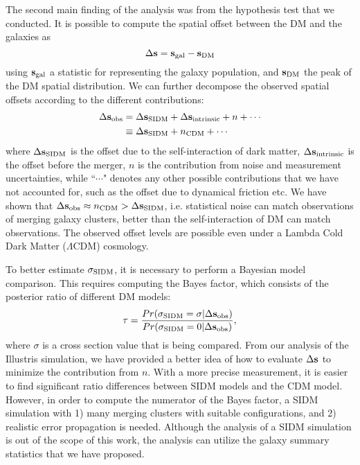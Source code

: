 The second main finding of the analysis was from the hypothesis test that we
conducted.
It is possible to compute the spatial 
offset between the DM and the galaxies as 
\begin{equation}
	\Delta {\bf s} =  {\bf s}_{\rm gal} - {\bf s}_{\rm DM}
\end{equation}
using ${\bf s}_{\rm gal}$ a statistic for representing the galaxy population,
and ${\bf s}_{\rm DM}$ the peak of the DM spatial distribution.
We can further decompose the observed spatial offsets according to the different
contributions: 
\begin{align}
	\Delta {\bf s}_{\rm obs} &= \Delta {\bf s}_{\mathrm{SIDM}} + \Delta {\bf s}_{\rm intrinsic} + n + \cdots
	\\
	&\equiv \Delta {\bf s}_{\mathrm{SIDM}} + n_{\rm CDM} + \cdots
\end{align}
where $\Delta {\bf s}_{\mathrm{SIDM}}$ is the offset due to the self-interaction of dark matter, 
$\Delta {\bf s}_{\rm intrinsic}$ is the offset before the merger, 
$n$ is the contribution from noise and measurement uncertainties, while ``$\cdots$" denotes
any other possible contributions that we have not accounted for, such as  
the offset due to dynamical friction etc.
We have shown that $\Delta {\bf s}_{\rm obs} \approx  n_{\rm CDM}  > \Delta {\bf s}_{\mathrm{SIDM}}$, i.e. 
statistical noise can match observations of merging galaxy clusters, better than 
the self-interaction of DM can match observations. 
The observed offset levels are possible even under  
a Lambda Cold Dark Matter ($\Lambda$CDM) cosmology. 

To better estimate $\sigma_{\rm SIDM}$, it is necessary to perform a Bayesian model 
comparison. This requires computing the Bayes factor, which consists of the
posterior ratio of different DM models:
\begin{equation}
	\tau = \frac{Pr(\sigma_{\rm SIDM} = \sigma| \Delta {\bf s}_{\rm obs})}{Pr(\sigma_{\rm SIDM} = 0|
		\Delta {\bf s}_{\rm obs})},
\end{equation}
where $\sigma$ is a cross section value that is being compared.
From our analysis of the Illustris simulation, we have provided a better idea of how to evaluate 
$\Delta {\bf s}$ to minimize the contribution from $n$. 
With a more precise measurement, it is easier to find significant ratio differences
between SIDM models and the CDM model. 
However, in order to compute the numerator of
the Bayes factor, a SIDM simulation with 1) many merging clusters with suitable
configurations, and 2) realistic error propagation is needed.  
Although the analysis of a SIDM simulation is out of the scope of this work, 
the analysis can utilize the galaxy summary statistics that we have proposed.  


